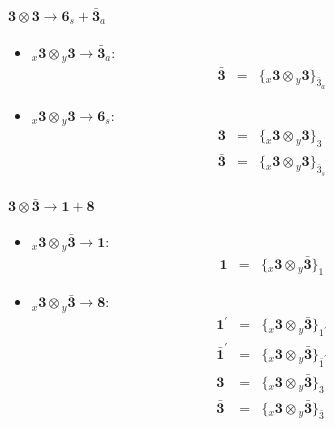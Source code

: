 \documentclass[english]{article}
\newcommand{\rep}[1]{\mathbf{#1}}
\newcommand{\repx}[2]{{}_{#2}\mathbf{#1}}
\newcommand{\subcg}[3]{\big\{ \repx{#1}{x}\otimes\repx{#2}{y}\big\}^{}_{#3}}
\begin{document}
\paragraph*{\Large $\rep{3}\otimes\rep{3}\to\rep{6}_s+\rep{\bar{3}}_a$}
\begin{itemize}
\item $\repx{3}{x}\otimes\repx{3}{y}\to\rep{\bar{3}}_{a}$:
\begin{eqnarray*}
\rep{\bar{3}} &=& \subcg{3}{3}{\bar{3}_{a}}
\end{eqnarray*}
\item $\repx{3}{x}\otimes\repx{3}{y}\to\rep{6}_{s}$:
\begin{eqnarray*}
\rep{3} &=& \subcg{3}{3}{3}
\\
\rep{\bar{3}} &=& \subcg{3}{3}{\bar{3}_{s}}
\end{eqnarray*}
\end{itemize}
\paragraph*{\Large $\rep{3}\otimes\rep{\bar{3}}\to\rep{1}+\rep{8}$}
\begin{itemize}
\item $\repx{3}{x}\otimes\repx{\bar{3}}{y}\to\rep{1}$:
\begin{eqnarray*}
\rep{1} &=& \subcg{3}{\bar{3}}{1}
\end{eqnarray*}
\item $\repx{3}{x}\otimes\repx{\bar{3}}{y}\to\rep{8}$:
\begin{eqnarray*}
\rep{1^{\prime}} &=& \subcg{3}{\bar{3}}{1^{\prime}}
\\
\rep{\bar{1}^{\prime}} &=& \subcg{3}{\bar{3}}{\bar{1}^{\prime}}
\\
\rep{3} &=& \subcg{3}{\bar{3}}{3}
\\
\rep{\bar{3}} &=& \subcg{3}{\bar{3}}{\bar{3}}
\end{eqnarray*}
\end{itemize}
\end{document}
